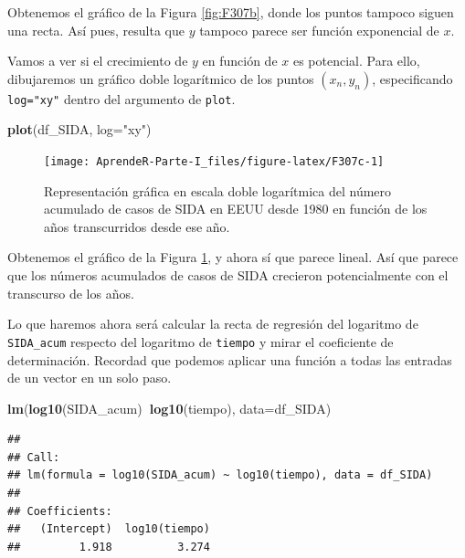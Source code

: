 \documentclass[]{book}
\newenvironment{Shaded}{\begin{snugshade}}{\end{snugshade}}
\newcommand{\DataTypeTok}[1]{\textcolor[rgb]{0.13,0.29,0.53}{#1}}
\newcommand{\KeywordTok}[1]{\textcolor[rgb]{0.13,0.29,0.53}{\textbf{#1}}}
\newcommand{\NormalTok}[1]{#1}
\newcommand{\OperatorTok}[1]{\textcolor[rgb]{0.81,0.36,0.00}{\textbf{#1}}}
\newcommand{\StringTok}[1]{\textcolor[rgb]{0.31,0.60,0.02}{#1}}
\theoremstyle{definition}
\theoremstyle{definition}
\theoremstyle{definition}
\theoremstyle{remark}
\begin{document}
Obtenemos el gráfico de la Figura \ref{fig:F307b}, donde los puntos tampoco siguen una recta. Así pues, resulta que \(y\) tampoco parece ser función exponencial de \(x\).

Vamos a ver si el crecimiento de \(y\) en función de \(x\) es potencial. Para ello, dibujaremos un gráfico doble logarítmico de los puntos \((x_n,y_n)\), especificando \texttt{log="xy"} dentro del argumento de \texttt{plot}.

\begin{Shaded}
\begin{Highlighting}[]
\KeywordTok{plot}\NormalTok{(df_SIDA, }\DataTypeTok{log=}\StringTok{"xy"}\NormalTok{)}
\end{Highlighting}
\end{Shaded}

\begin{figure}

{\centering \texttt{[image: AprendeR-Parte-I\_files/figure-latex/F307c-1]} 

}

\caption{Representación gráfica en escala doble logarítmica  del número acumulado de casos de SIDA en EEUU desde 1980 en función de los años transcurridos desde ese año.}\label{fig:F307c}
\end{figure}

Obtenemos el gráfico de la Figura \ref{fig:F307c}, y ahora sí que parece lineal. Así que parece que los números acumulados de casos de SIDA crecieron potencialmente con el transcurso de los años.

Lo que haremos ahora será calcular la recta de regresión del logaritmo de \texttt{SIDA\_acum} respecto del logaritmo de \texttt{tiempo} y mirar el coeficiente de determinación. Recordad que podemos aplicar una función a todas las entradas de un vector en un solo paso.

\begin{Shaded}
\begin{Highlighting}[]
\KeywordTok{lm}\NormalTok{(}\KeywordTok{log10}\NormalTok{(SIDA_acum)}\OperatorTok{~}\KeywordTok{log10}\NormalTok{(tiempo), }\DataTypeTok{data=}\NormalTok{df_SIDA)}
\end{Highlighting}
\end{Shaded}

\begin{verbatim}
## 
## Call:
## lm(formula = log10(SIDA_acum) ~ log10(tiempo), data = df_SIDA)
## 
## Coefficients:
##   (Intercept)  log10(tiempo)  
##         1.918          3.274
\end{verbatim}
\end{document}
